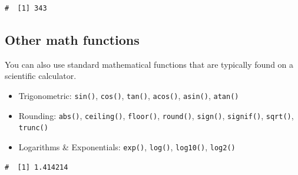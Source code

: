 \documentclass[a4paper,9pt,twocolumn,twoside,printwatermark=false]{pinp}
\providecommand{\tightlist}{%
  \setlength{\itemsep}{0pt}\setlength{\parskip}{0pt}}
\begin{document}
\begin{Shaded}
\begin{Highlighting}[]
\OperatorTok{^} 
\end{Highlighting}
\end{Shaded}

\begin{ShadedResult}
\begin{verbatim}
#  [1] 343
\end{verbatim}
\end{ShadedResult}

\subsection{Other math functions}\label{other-math-functions}

You can also use standard mathematical functions that are typically
found on a scientific calculator.

\begin{itemize}
\tightlist
\item
  Trigonometric: \texttt{sin()}, \texttt{cos()}, \texttt{tan()},
  \texttt{acos()}, \texttt{asin()}, \texttt{atan()}
\item
  Rounding: \texttt{abs()}, \texttt{ceiling()}, \texttt{floor()},
  \texttt{round()}, \texttt{sign()}, \texttt{signif()}, \texttt{sqrt()},
  \texttt{trunc()}
\item
  Logarithms \& Exponentials: \texttt{exp()}, \texttt{log()},
  \texttt{log10()}, \texttt{log2()}
\end{itemize}

\begin{Shaded}
\begin{Highlighting}[]
\NormalTok{(}\NormalTok{)          }
\end{Highlighting}
\end{Shaded}

\begin{ShadedResult}
\begin{verbatim}
#  [1] 1.414214
\end{verbatim}
\end{ShadedResult}

\begin{Shaded}
\begin{Highlighting}[]
\NormalTok{(}\NormalTok{)}
\end{Highlighting}
\end{Shaded}
\end{document}

